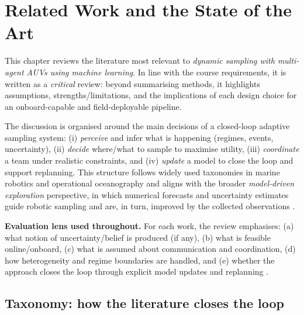 %

\chapter{Related Work and the State of the Art} \label{chap:ch3}

This chapter reviews the literature most relevant to \emph{dynamic sampling with multi-agent AUVs using machine learning}.
In line with the course requirements, it is written as a \emph{critical} review: beyond summarising methods, it highlights
assumptions, strengths/limitations, and the implications of each design choice for an onboard-capable and field-deployable
pipeline.

The discussion is organised around the main decisions of a closed-loop adaptive sampling system:
(i) \emph{perceive} and infer what is happening (regimes, events, uncertainty),
(ii) \emph{decide} where/what to sample to maximise utility,
(iii) \emph{coordinate} a team under realistic constraints, and
(iv) \emph{update} a model to close the loop and support replanning.
This structure follows widely used taxonomies in marine robotics and operational oceanography
\parencite{hwang2019auvreview,bernacchi2025closingloop,lermusiaux2007adaptive} and aligns with the broader
\emph{model-driven exploration} perspective, in which numerical forecasts and uncertainty estimates guide robotic sampling
and are, in turn, improved by the collected observations \parencite{mendes2025oceanmodeldriven,curtin2009aosn,duarte2025geostatistical}.

\vspace{1mm}
\noindent\textbf{Evaluation lens used throughout.}
For each work, the review emphasises:
(a) what notion of uncertainty/belief is produced (if any),
(b) what is feasible online/onboard,
(c) what is assumed about communication and coordination,
(d) how heterogeneity and regime boundaries are handled, and
(e) whether the approach closes the loop through explicit model updates and replanning
\parencite{hwang2019auvreview,bernacchi2025closingloop,lermusiaux2007adaptive}.

\section{Taxonomy: how the literature closes the loop} \label{sec:taxonomy}

